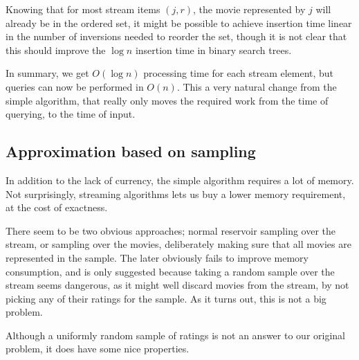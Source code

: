 Knowing that for most stream items $(j,r)$, the movie represented by
$j$ will already be in the ordered set, it might be possible to achieve
insertion time linear in the number of inversions needed to reorder the set,
though it is not clear that this should improve the $\log n$ insertion time in
binary search trees.

In summary, we get $O(\log n)$ processing time for each stream element, but
queries can now be performed in $O(n)$. This a very natural change from the
simple algorithm, that really only moves the required work from the time of
querying, to the time of input.

\subsection{Approximation based on sampling}
In addition to the lack of currency, the simple algorithm requires a lot of
memory. Not surprisingly, streaming algorithms lets us buy a lower memory
requirement, at the cost of exactness.

There seem to be two obvious approaches;
normal reservoir sampling over the stream, or sampling over the
movies, deliberately making sure that all movies are represented in the sample.
The later obviously fails to improve memory consumption, and is only suggested
because taking a random sample over the stream seems dangerous, as it might well
discard movies from the stream, by not picking any of their ratings for the
sample. As it turns out, this is not a big problem.

Although a uniformly random sample of ratings is not an answer to our original
problem, it does have some nice properties.

